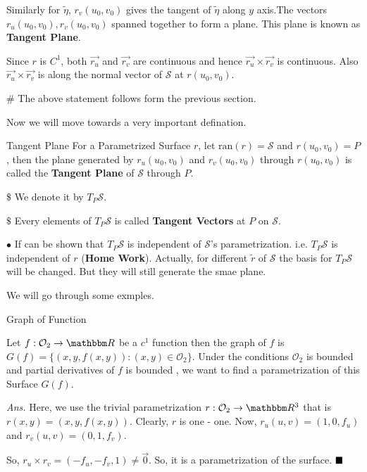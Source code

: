 \documentclass[Analysis-3]{subfiles}
\begin{document}
\vspace{0.2cm}

Similarly for $\tilde{\eta}$, $r_v(u_0,v_0)$  gives the tangent of $\tilde{\eta}$ along $y$ axis.The vectors $r_u(u_0,v_0),r_v(u_0,v_0)$ spanned together to form a plane. This plane is known as \textbf{Tangent Plane}.

\vspace{0.2cm}

Since $r$ is $C^1$, both $\vec{r_u}$ and $\vec{r_v}$ are continuous and hence $\vec{r_u} \times \vec{r_v}$ is continuous. Also $\vec{r_u} \times \vec{r_v}$ is along the normal vector of $\mathcal{S}$ at $r(u_0,v_0)$.

\vspace{0.2cm}

$\#$ The above statement follows form the previous section. 

Now we will move towards a very important defination.

\begin{Def}{Tangent Plane}{}
    For a Parametrized Surface $r$, let $\text{ran}(r)=\mathcal{S}$ and $r(u_0,v_0)=P$, then the plane generated by $r_u(u_0,v_0)$ and $r_v(u_0,v_0)$ through $r(u_0,v_0)$ is called the \textbf{Tangent Plane} of $\mathcal{S}$ through $P$. 
    
    \vspace{0.2cm}

    $\$$ We denote it by $T_P\mathcal{S}$.

    $\$$ Every elements of $T_P\mathcal{S}$ is called \textbf{Tangent Vectors} at $P$ on $\mathcal{S}$.
\end{Def}

$\bullet$ If can be shown that $T_P\mathcal{S}$ is independent of $\mathcal{S}$'s parametrization. i.e. $T_P\mathcal{S}$ is independent of $r$ (\textbf{Home Work}). Actually, for different $\tilde{r}$ of $\mathcal{S}$ the basis for $T_P\mathcal{S}$ will be changed. But they will still generate the smae plane.

\vspace{0.2cm}

We will go through some exmples.

\begin{Eg}{Graph of Function}{}\label{eg:grp}
  
    Let $f : \mathcal{O}_2 \to \R$ be a $c^1$ function then the graph of $f$ is $G(f) = \{ (x,y,f(x,y)) : (x,y)\in \mathcal{O}_2\}$. Under the conditions $\mathcal{O}_2$ is bounded and partial derivatives of $f$ is bounded , we want to find a parametrization of this Surface $G(f)$. 
      
    \vspace{0.2cm}

    \textit{Ans.} Here, we use the trivial parametrization $r : \mathcal{O}_2 \to \R^3$ that is $ r(x,y) = (x,y,f(x,y))$. Clearly, $r$ is one - one. Now, $r_u(u,v) = (1,0,f_u)$ and $r_v(u,v) = (0,1,f_v)$. 

    \vspace{0.2cm}

    So, $ r_u \times r_v = (-f_u,-f_v,1) \neq \vec{0}$. So, it is a parametrization of the surface. $\hfill \blacksquare$
\end{Eg}
\end{document}
